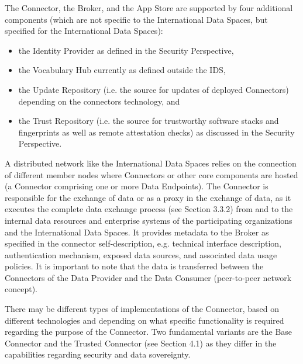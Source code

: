 
The Connector, the Broker, and the App Store are supported by four additional components (which are not specific to the International Data Spaces, but specified for the International Data Spaces):

\begin{itemize}
	\item the Identity Provider as defined in the Security Perspective,

	\item the Vocabulary Hub currently as defined outside the IDS,

	\item the Update Repository (i.e. the source for updates of deployed Connectors) depending on the connectors technology, and

	\item the Trust Repository (i.e. the source for trustworthy software stacks and fingerprints as well as remote attestation checks) as discussed in the Security Perspective.
\end{itemize}

A distributed network like the International Data Spaces relies on the connection of different member nodes where Connectors or other core components are hosted (a Connector comprising one or more Data Endpoints). The Connector is responsible for the exchange of data or as a proxy in the exchange of data, as it executes the complete data exchange process (see Section 3.3.2) from and to the internal data resources and enterprise systems of the participating organizations and the International Data Spaces. It provides metadata to the Broker as specified in the connector self-description, e.g. technical interface description, authentication mechanism, exposed data sources, and associated data usage policies. It is important to note that the data is transferred between the Connectors of the Data Provider and the Data Consumer (peer-to-peer network concept).

There may be different types of implementations of the Connector, based on different technologies and depending on what specific functionality is required regarding the purpose of the Connector. Two fundamental variants are the Base Connector and the Trusted Connector (see Section 4.1) as they differ in the capabilities regarding security and data sovereignty.

